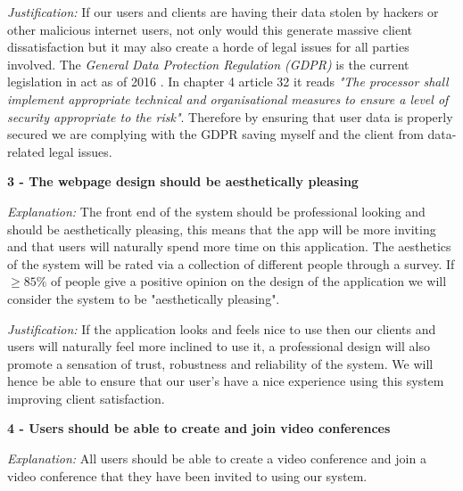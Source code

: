 \vspace{0.1cm}

\textit{Justification:}
If our users and clients are having their data stolen by
hackers or other malicious internet users, not only would this 
generate massive client dissatisfaction but it may also create
a horde of legal issues for all parties involved. The 
\textit{General Data Protection Regulation (GDPR)} is the
current legislation in act as of 2016 \cite{gdpr}. In chapter 4 
article 32 it reads \textit{"The processor shall implement
appropriate technical and organisational measures to ensure
a level of security appropriate to the risk"}. Therefore by 
ensuring that user data is properly secured we are complying 
with the GDPR saving myself and the client from data-related
legal issues.

\vspace{0.2cm}

\textsf{\bfseries 3 - The webpage design should be aesthetically
pleasing}

\vspace{0.1cm}

\textit{Explanation:} 
The front end of the system should be professional looking and
should be aesthetically pleasing, this means that the app
will be more inviting and that users will naturally spend more
time on this application. The aesthetics of the system will be
rated via a collection of different people through a survey.
If $\geq 85\%$ of people give a positive opinion on the 
design of the application we will consider the system to be 
"aesthetically pleasing".

\vspace{0.1cm}

\textit{Justification:}
If the application looks and feels nice to use then our 
clients and users will naturally feel more inclined to use it,
a professional design will also promote a sensation of trust,
robustness and reliability of the system. We will hence be
able to ensure that our user's have a nice experience using 
this system improving client satisfaction.

\vspace{0.2cm}

\textsf{\bfseries 4 - Users should be able to create and 
join video conferences}


\vspace{0.1cm}

\textit{Explanation:}
All users should be able to create a video conference and
join a video conference that they have been invited to 
using our system.

